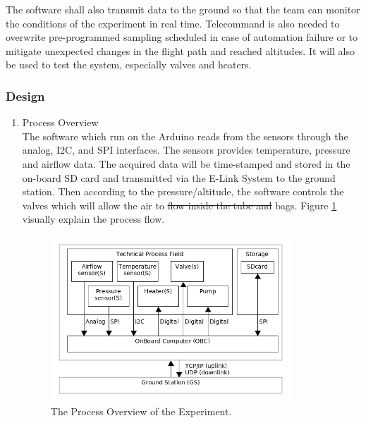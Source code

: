 \documentclass[a4paper,12pt,oneside]{article} %
\providecommand{\DIFaddtex}[1]{{\protect\color{blue}\uwave{#1}}} %
\providecommand{\DIFdeltex}[1]{{\protect\color{red}\sout{#1}}}                      %
\providecommand{\DIFaddbegin}{} %
\providecommand{\DIFaddend}{} %
\providecommand{\DIFdelbegin}{} %
\providecommand{\DIFdelend}{} %
\providecommand{\DIFaddbeginFL}{} %
\providecommand{\DIFaddendFL}{} %
\providecommand{\DIFdelbeginFL}{} %
\providecommand{\DIFdelendFL}{} %
\providecommand{\DIFadd}[1]{\texorpdfstring{\DIFaddtex{#1}}{#1}} %
\providecommand{\DIFdel}[1]{\texorpdfstring{\DIFdeltex{#1}}{}} %
\newcommand{\DIFscaledelfig}{0.5}
\newlength{\DIFdelgraphicswidth} %
\newlength{\DIFdelgraphicsheight} %
\newcommand{\DIFaddincludegraphics}[2][]{{\color{blue}\fbox{\DIFOincludegraphics[#1]{#2}}}} %
\newcommand{\DIFdelincludegraphics}[2][]{%
\sbox{\DIFdelgraphicsbox}{\DIFOincludegraphics[#1]{#2}}%
\settoboxwidth{\DIFdelgraphicswidth}{\DIFdelgraphicsbox} %
\settoboxtotalheight{\DIFdelgraphicsheight}{\DIFdelgraphicsbox} %
\scalebox{\DIFscaledelfig}{%
\parbox[b]{\DIFdelgraphicswidth}{\usebox{\DIFdelgraphicsbox}\\[-\baselineskip] \rule{\DIFdelgraphicswidth}{0em}}\llap{\resizebox{\DIFdelgraphicswidth}{\DIFdelgraphicsheight}{%
\setlength{\unitlength}{\DIFdelgraphicswidth}%
\begin{picture}(1,1)%
\thicklines\linethickness{2pt} %
{\color[rgb]{1,0,0}\put(0,0){\framebox(1,1){}}}%
{\color[rgb]{1,0,0}\put(0,0){\line( 1,1){1}}}%
{\color[rgb]{1,0,0}\put(0,1){\line(1,-1){1}}}%
\end{picture}%
}\hspace*{3pt}}} %
} %
\DeclareRobustCommand{\DIFaddbegin}{\DIFOaddbegin \let\includegraphics\DIFaddincludegraphics} %
\DeclareRobustCommand{\DIFaddend}{\DIFOaddend \let\includegraphics\DIFOincludegraphics} %
\DeclareRobustCommand{\DIFdelbegin}{\DIFOdelbegin \let\includegraphics\DIFdelincludegraphics} %
\DeclareRobustCommand{\DIFdelend}{\DIFOaddend \let\includegraphics\DIFOincludegraphics} %
\DeclareRobustCommand{\DIFaddbeginFL}{\DIFOaddbeginFL \let\includegraphics\DIFaddincludegraphics} %
\DeclareRobustCommand{\DIFaddendFL}{\DIFOaddendFL \let\includegraphics\DIFOincludegraphics} %
\DeclareRobustCommand{\DIFdelbeginFL}{\DIFOdelbeginFL \let\includegraphics\DIFdelincludegraphics} %
\DeclareRobustCommand{\DIFdelendFL}{\DIFOaddendFL \let\includegraphics\DIFOincludegraphics} %
\begin{document}
The software shall also transmit data to the ground so that the team can monitor the conditions of the experiment in real time. Telecommand is also needed to overwrite pre-programmed sampling scheduled in case of automation failure or to mitigate unexpected changes in the flight path and reached altitudes. It will also be used to test the system, especially valves and heaters.\par
\DIFaddbegin 

\DIFaddend \subsubsection{Design} \label{sec:4.8.2}
\begin{enumerate}[label=(\alph*)]
\item{Process Overview}\\
The software which run on the Arduino reads from the sensors through the analog, I2C, and SPI interfaces. The sensors provides temperature, pressure and airflow data. The acquired data will be time-stamped and stored in the on-board SD card and transmitted via the E-Link System to the ground station. Then according to the pressure/altitude, the software controls the valves which will allow the air to \DIFdelbegin \DIFdel{flow inside the tube and }\DIFdelend \DIFaddbegin \DIFadd{be pumped inside the }\DIFaddend bags. Figure \ref{processOverview} visually explain the process flow.

\begin{figure}[H]
    \centering
    \DIFdelbeginFL %
\DIFdelendFL \DIFaddbeginFL \includegraphics[width=0.85\textwidth]{4-experiment-design/img/Process-overview-V0-3.png}
    \DIFaddendFL \caption{The Process Overview of the Experiment.}
    \label{processOverview}
\end{figure}


\end{enumerate}
\end{document}
